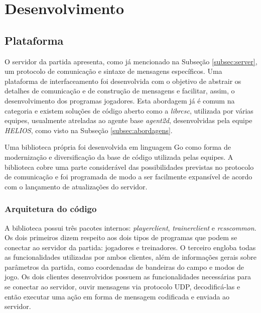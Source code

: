 \chapter{Desenvolvimento}
\label{chap:Desenvolvimento}




\section{Plataforma} \label{sec:lib}
\par O servidor da partida apresenta, como já mencionado na Subseção \ref{subsec:server}, um protocolo de comunicação e sintaxe de mensagens específicos. Uma plataforma de interfaceamento foi desenvolvida com o objetivo de abstrair os detalhes de comunicação e de construção de mensagens e facilitar, assim, o desenvolvimento dos programas jogadores. Esta abordagem já é comum na categoria e existem soluções de código aberto como a \textit{librcsc}, utilizada por várias equipes, usualmente atreladas ao agente base \textit{agent2d}, desenvolvidas pela equipe \textit{HELIOS}, como visto na Subseção \ref{subsec:abordagens}.
\par Uma biblioteca própria foi desenvolvida em linguagem Go como forma de modernização e diversificação da base de código utilizada pelas equipes. A biblioteca cobre uma parte considerável das possibilidades previstas no protocolo de comunicação e foi programada de modo a ser facilmente expansível de acordo com o lançamento de atualizações do servidor.

\subsection{Arquitetura do código}
A biblioteca possui três pacotes internos: \textit{playerclient}, \textit{trainerclient} e \textit{rcsscommon}. Os dois primeiros dizem respeito aos dois tipos de programas que podem se conectar ao servidor da partida: jogadores e treinadores. O terceiro engloba todas as funcionalidades utilizadas por ambos clientes, além de informações gerais sobre parâmetros da partida, como coordenadas de bandeiras do campo e modos de jogo. Os dois clientes desenvolvidos possuem as funcionalidades necessárias para se conectar ao servidor, ouvir mensagens via protocolo UDP, decodificá-las e então executar uma ação em forma de mensagem codificada e enviada ao servidor.

